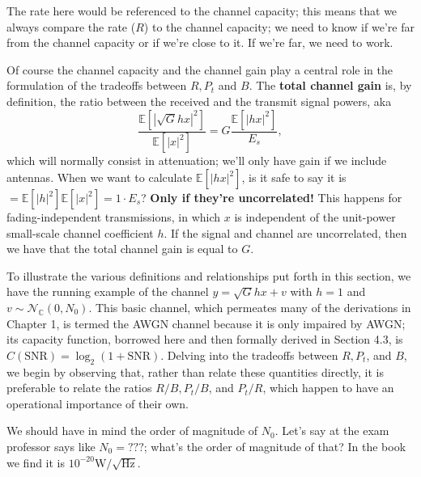 \documentclass[a4paper, 12pt]{book}
\begin{document}
The rate here would be referenced to the channel capacity; this means that we always compare the rate ($R$) to the channel capacity; we need to know if we're far from the channel capacity or if we're close to it. If we're far, we need to work.


Of course the channel capacity and the channel gain play a central role in the formulation of the tradeoffs between $R, P_t$ and $B$. The \textbf{total channel gain} is, by definition, the ratio between the received and the transmit signal powers, aka
\begin{equation}
    \frac{\mathbb{E}[|\sqrt{G}hx|^2]}{\mathbb{E}[|x|^2]} = G \frac{\mathbb{E}[|hx|^2]}{E_s} , \tag{4.1}
\end{equation}
which will normally consist in attenuation; we'll only have gain if we include antennas.
When we want to calculate $\mathbb{E}[|hx|^2]$, is it safe to say it is $= \mathbb{E}[|h|^2]\mathbb{E}[|x|^2] = 1 \cdot E_s$? \textbf{Only if they're uncorrelated!} This happens for fading-independent transmissions, in which $x$ is independent of the unit-power small-scale channel coefficient $h$.
If the signal and channel are uncorrelated, then we have that the total channel gain is equal to $G$.

\begin{yellowbox}
To illustrate the various definitions and relationships put forth in this section, we have the running example of the channel $y = \sqrt{G}hx + v$ with $h=1$ and $v \sim \mathcal{N}_{\mathbb{C}}(0, N_0)$. This basic channel, which permeates many of the derivations in Chapter 1, is termed the AWGN channel because it is only impaired by AWGN; its capacity function, borrowed here and then formally derived in Section 4.3, is $C(\text{SNR}) = \log_2(1 + \text{SNR})$.
Delving into the tradeoffs between $R, P_t$, and $B$, we begin by observing that, rather than relate these quantities directly, it is preferable to relate the ratios $R/B, P_t/B$, and $P_t/R$, which happen to have an operational importance of their own.
\end{yellowbox}

\begin{tcolorbox}[colframe=red, colback=white, title=\faBolt\ Exam, fonttitle=\bfseries]
We should have in mind the order of magnitude of $N_0$. Let's say at the exam professor says like $N_0 = ???$; what's the order of magnitude of that? In the book we find it is $10^{-20} \text{W}/\sqrt{\text{Hz}}$.
\end{tcolorbox}
\end{document}
